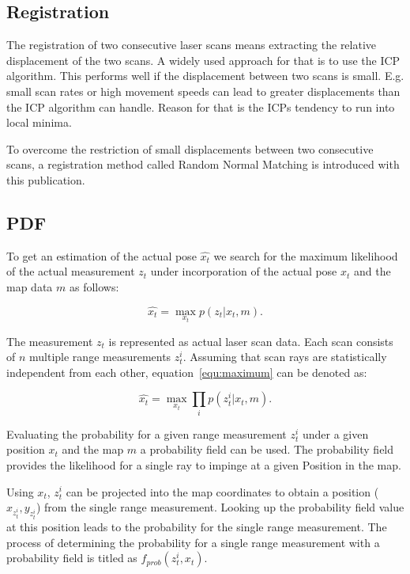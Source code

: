 \documentclass[conference]{IEEEtran}
\begin{document}
\subsection{Registration}
The registration of two consecutive laser scans means extracting the relative displacement of the two scans. A widely used approach for that is to use the ICP algorithm. This performs well if the displacement between two scans is small. E.g. small scan rates or high movement speeds can lead to greater displacements than the ICP algorithm can handle. Reason for that is the ICPs tendency to run into local minima. 

To overcome the restriction of small displacements between two consecutive scans, a registration method called Random Normal Matching is introduced with this publication.

\subsection{PDF}
To get an estimation of the actual pose $\widehat{x_t}$  we search for the maximum likelihood of the actual measurement $z_t$ under incorporation of the actual pose $x_t$ and the map data $m$ as follows:

\begin{equation}
	\label{equ:maximum}
	\widehat{x_t} = \max_{x_t} p \left (  z_t|x_t,m \right ).
\end{equation}

The measurement $z_t$ is represented as actual laser scan data. Each scan consists of $n$ multiple range measurements $z^i_t$. Assuming that scan rays are statistically independent from each other, equation~\ref{equ:maximum} can be denoted as:

\begin{equation}
	\label{equ:multiply}
	\widehat{x_t} = \max_{x_t} \prod_i p \left ( z^i_t|x_t,m \right ).
\end{equation}

Evaluating the probability for a given range measurement $z^i_t$ under a given position $x_t$ and the map $m$ a probability field can be used. The probability field provides the likelihood for a single ray to impinge at a given Position in the map.

Using $x_t$, $z^i_t$ can be projected into the map coordinates to obtain a position ($x_{z^i_t}, y_{z^i_t}$) from the single range measurement. Looking up the probability field value at this position leads to the probability for the single range measurement. The process of determining the probability for a single range measurement with a probability field is titled as $f_{prob}(z^i_t, x_t)$.
\end{document}
